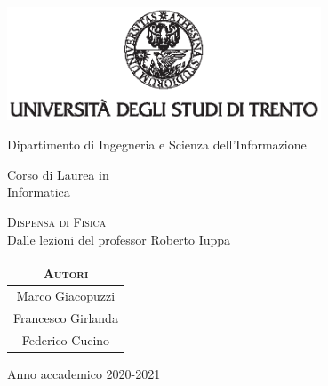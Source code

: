 \documentclass[class=book, crop=false, oneside]{standalone}
\begin{document}
\begin{titlepage}
	\centering
	\includegraphics[width=0.7\textwidth, keepaspectratio]{logo-unitn.eps}

	\vspace{1.3cm}
	\LARGE{Dipartimento di Ingegneria e Scienza dell'Informazione\\}

	\vspace{.9cm}
	\Large{Corso di Laurea in\\ Informatica}

	\vspace{.9cm}
	\Huge\textsc{Dispensa di Fisica\\}
	\vspace{.3cm}
	\large{Dalle lezioni del professor Roberto Iuppa}

	\vspace{2.8cm}

    {
    \centering
    \begin{tabular}{c}
    \LARGE\textsc{Autori} \\
    \hline
    \rule{0pt}{0.6cm}  
    Marco Giacopuzzi \\
	Francesco Girlanda \\
	Federico Cucino \\
    \end{tabular}
    } 

	\vspace{2.2cm}
	\LARGE{Anno accademico 2020-2021}
\end{titlepage}
\end{document}
